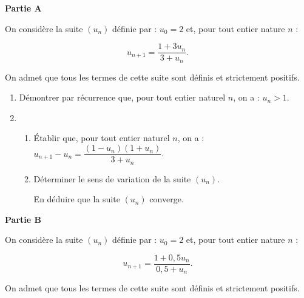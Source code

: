 \textbf{Partie A}

\medskip
 
On considère la suite $\left(u_{n}\right)$ définie par : $u_{0} = 2$ et, pour tout entier nature $n$ : 

\[u_{n+1} = \dfrac{1 + 3u_{n}}{3 + u_{n}}.\] 
 
On admet que tous les termes de cette suite sont définis et strictement positifs.

\medskip
 
\begin{enumerate}
\item Démontrer par récurrence que, pour tout entier naturel $n$, on a : $u_{n} > 1$. 
\item  
	\begin{enumerate}
		\item Établir que, pour tout entier naturel $n$, on a : $u_{n+1}- u_{n} = \dfrac{\left(1 - u_{n} \right)\left(1 + u_{n} \right)}{3+ u_{n}}$.
		\item Déterminer le sens de variation de la suite $\left(u_{n}\right)$. 

En déduire que la suite $\left(u_{n}\right)$ converge. 
	\end{enumerate}
\end{enumerate}
	
\bigskip

\textbf{Partie B}

\medskip

On considère la suite $\left(u_{n}\right)$ 	définie par : $u_{0} = 2$ et, pour tout entier nature $n$ :

\[u_{n+1} = \dfrac{1 + 0,5u_{n}}{0,5 + u_{n}}.\]
 
On admet que tous les termes de cette suite sont définis et strictement positifs.

\medskip
 
